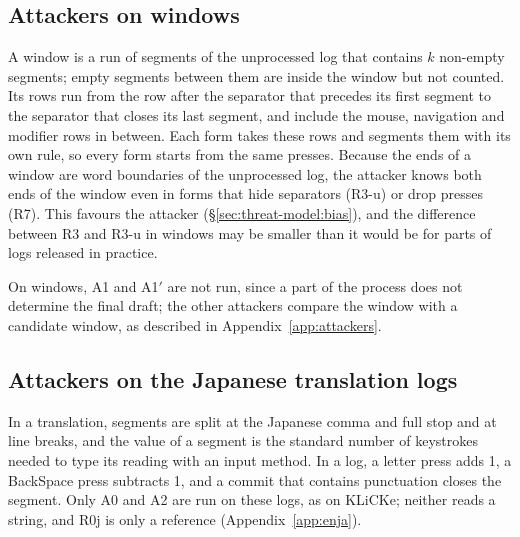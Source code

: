 \subsection{Attackers on windows}
\label{sec:attackers:windows}

A window is a run of segments of the unprocessed log that contains $k$ non-empty segments; empty segments between them
are inside the window but not counted. Its rows run from the row after the separator that precedes its first segment
to the separator that closes its last segment, and include the mouse, navigation and modifier rows in between. Each
form takes these rows and segments them with its own rule, so every form starts from the same presses. Because the
ends of a window are word boundaries of the unprocessed log, the attacker knows both ends of the window even in forms
that hide separators (R3-u) or drop presses (R7). This favours the attacker
(\S\ref{sec:threat-model:bias}), and the difference between R3 and R3-u in windows may be smaller than it would be for
parts of logs released in practice.

On windows, A1 and A1$'$ are not run, since a part of the process does not determine the final draft; the other
attackers compare the window with a candidate window, as described in Appendix~\ref{app:attackers}.

\subsection{Attackers on the Japanese translation logs}
\label{sec:attackers:enja}

In a translation, segments are split at the Japanese comma and full stop and at line breaks, and the value of a
segment is the standard number of keystrokes needed to type its reading with an input method. In a log, a letter press
adds 1, a BackSpace press subtracts 1, and a commit that contains punctuation closes the segment. Only A0 and A2 are
run on these logs, as on KLiCKe; neither reads a string, and R0j is only a reference (Appendix~\ref{app:enja}).
